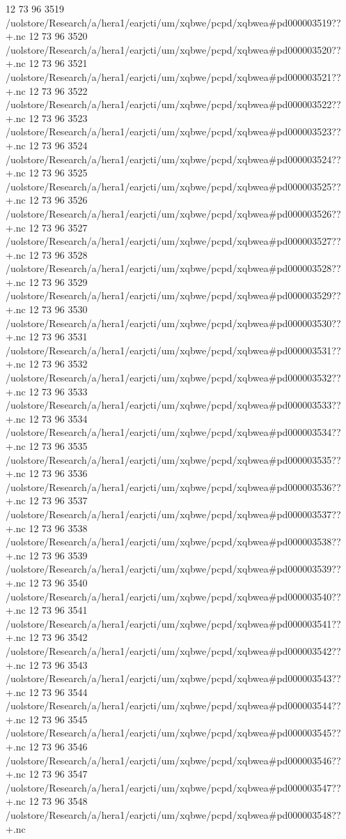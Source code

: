 12 73 96
3519
/uolstore/Research/a/hera1/earjcti/um/xqbwe/pcpd/xqbwea#pd000003519??+.nc
12 73 96
3520
/uolstore/Research/a/hera1/earjcti/um/xqbwe/pcpd/xqbwea#pd000003520??+.nc
12 73 96
3521
/uolstore/Research/a/hera1/earjcti/um/xqbwe/pcpd/xqbwea#pd000003521??+.nc
12 73 96
3522
/uolstore/Research/a/hera1/earjcti/um/xqbwe/pcpd/xqbwea#pd000003522??+.nc
12 73 96
3523
/uolstore/Research/a/hera1/earjcti/um/xqbwe/pcpd/xqbwea#pd000003523??+.nc
12 73 96
3524
/uolstore/Research/a/hera1/earjcti/um/xqbwe/pcpd/xqbwea#pd000003524??+.nc
12 73 96
3525
/uolstore/Research/a/hera1/earjcti/um/xqbwe/pcpd/xqbwea#pd000003525??+.nc
12 73 96
3526
/uolstore/Research/a/hera1/earjcti/um/xqbwe/pcpd/xqbwea#pd000003526??+.nc
12 73 96
3527
/uolstore/Research/a/hera1/earjcti/um/xqbwe/pcpd/xqbwea#pd000003527??+.nc
12 73 96
3528
/uolstore/Research/a/hera1/earjcti/um/xqbwe/pcpd/xqbwea#pd000003528??+.nc
12 73 96
3529
/uolstore/Research/a/hera1/earjcti/um/xqbwe/pcpd/xqbwea#pd000003529??+.nc
12 73 96
3530
/uolstore/Research/a/hera1/earjcti/um/xqbwe/pcpd/xqbwea#pd000003530??+.nc
12 73 96
3531
/uolstore/Research/a/hera1/earjcti/um/xqbwe/pcpd/xqbwea#pd000003531??+.nc
12 73 96
3532
/uolstore/Research/a/hera1/earjcti/um/xqbwe/pcpd/xqbwea#pd000003532??+.nc
12 73 96
3533
/uolstore/Research/a/hera1/earjcti/um/xqbwe/pcpd/xqbwea#pd000003533??+.nc
12 73 96
3534
/uolstore/Research/a/hera1/earjcti/um/xqbwe/pcpd/xqbwea#pd000003534??+.nc
12 73 96
3535
/uolstore/Research/a/hera1/earjcti/um/xqbwe/pcpd/xqbwea#pd000003535??+.nc
12 73 96
3536
/uolstore/Research/a/hera1/earjcti/um/xqbwe/pcpd/xqbwea#pd000003536??+.nc
12 73 96
3537
/uolstore/Research/a/hera1/earjcti/um/xqbwe/pcpd/xqbwea#pd000003537??+.nc
12 73 96
3538
/uolstore/Research/a/hera1/earjcti/um/xqbwe/pcpd/xqbwea#pd000003538??+.nc
12 73 96
3539
/uolstore/Research/a/hera1/earjcti/um/xqbwe/pcpd/xqbwea#pd000003539??+.nc
12 73 96
3540
/uolstore/Research/a/hera1/earjcti/um/xqbwe/pcpd/xqbwea#pd000003540??+.nc
12 73 96
3541
/uolstore/Research/a/hera1/earjcti/um/xqbwe/pcpd/xqbwea#pd000003541??+.nc
12 73 96
3542
/uolstore/Research/a/hera1/earjcti/um/xqbwe/pcpd/xqbwea#pd000003542??+.nc
12 73 96
3543
/uolstore/Research/a/hera1/earjcti/um/xqbwe/pcpd/xqbwea#pd000003543??+.nc
12 73 96
3544
/uolstore/Research/a/hera1/earjcti/um/xqbwe/pcpd/xqbwea#pd000003544??+.nc
12 73 96
3545
/uolstore/Research/a/hera1/earjcti/um/xqbwe/pcpd/xqbwea#pd000003545??+.nc
12 73 96
3546
/uolstore/Research/a/hera1/earjcti/um/xqbwe/pcpd/xqbwea#pd000003546??+.nc
12 73 96
3547
/uolstore/Research/a/hera1/earjcti/um/xqbwe/pcpd/xqbwea#pd000003547??+.nc
12 73 96
3548
/uolstore/Research/a/hera1/earjcti/um/xqbwe/pcpd/xqbwea#pd000003548??+.nc

